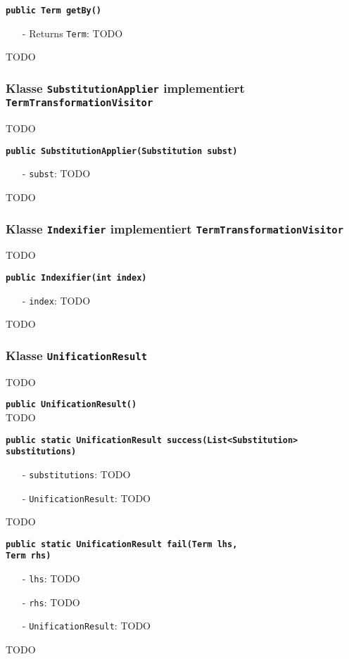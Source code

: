 \documentclass[parskip=full,11pt,twoside]{scrartcl}
\begin{document}
\textbf{\texttt{public Term getBy()}}
\begin{itemize}[noitemsep]
	\item[-] Returns \texttt{Term}: TODO
\end{itemize}
TODO

\subsubsection{Klasse \texttt{SubstitutionApplier} implementiert \texttt{TermTransformationVisitor}}
TODO

\textbf{\texttt{public SubstitutionApplier(Substitution subst)}}
\begin{itemize}[noitemsep]
	\item[-] \texttt{subst}: TODO
\end{itemize}
TODO

\subsubsection{Klasse \texttt{Indexifier} implementiert \texttt{TermTransformationVisitor}}
TODO

\textbf{\texttt{public Indexifier(int index)}}
\begin{itemize}[noitemsep]
	\item[-] \texttt{index}: TODO
\end{itemize}
TODO
\subsubsection{Klasse \texttt{UnificationResult}}
TODO

\textbf{\texttt{public UnificationResult()}}\\
TODO

\textbf{\texttt{public static UnificationResult success(List<Substitution>\\substitutions)}}
\begin{itemize}[noitemsep]
	\item[-] \texttt{substitutions}: TODO
	\item[-] \texttt{UnificationResult}: TODO
\end{itemize}
TODO

\textbf{\texttt{public static UnificationResult fail(Term lhs,\\Term rhs)}}
\begin{itemize}[noitemsep]
	\item[-] \texttt{lhs}: TODO
	\item[-] \texttt{rhs}: TODO
	\item[-] \texttt{UnificationResult}: TODO
\end{itemize}
TODO
\end{document}
